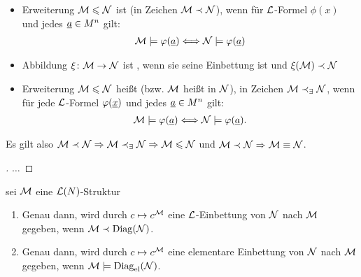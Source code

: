 \begin{definition}
	\begin{itemize}
		\item Erweiterung $\mathcal M \leqslant \mathcal N$ ist  (in Zeichen $\mathcal M \prec \mathcal N$), wenn für  $\mathcal L$-Formel $\phi(x)$ und jedes $\underline{a} \in M^n$ gilt:
		\begin{align*}
		\mathcal M \models \varphi(\underline{a}) \Longleftrightarrow \mathcal N \models \varphi(\underline{a})
		\end{align*}
		\item Abbildung $\xi \colon \mathcal M \to \mathcal N$ ist , wenn sie seine Einbettung ist und $\xi(\mathcal M) \prec \mathcal N$
		\item Erweiterung $\mathcal M \leqslant \mathcal N$ heißt  (bzw. $\mathcal M$ heißt  in $\mathcal N$), in Zeichen $\mathcal M \prec_{\exists} \mathcal N$, wenn für jede  $\mathcal L$-Formel $\varphi(\underline{x})$ und jedes $\underline{a} \in M^n$ gilt:
		\begin{align*}
			\mathcal M \models \varphi(\underline{a}) \Longleftrightarrow \mathcal N \models \varphi(\underline{a}).
		\end{align*}
	\end{itemize}
\end{definition}
\begin{remark}
	Es gilt also $\mathcal M\prec \mathcal N \Rightarrow \mathcal M \prec_{\exists} \mathcal N \Rightarrow \mathcal M \leqslant \mathcal N$ und $\mathcal M \prec \mathcal N \Rightarrow \mathcal M \equiv \mathcal N$.
\end{remark}
\begin{proof}[]
	$\dots$
\end{proof}
\begin{remark}
	 sei $\mathcal M$ eine $\mathcal L(N)$-Struktur
	\begin{enumerate}
		\item Genau dann, wird durch $c \mapsto c^{\mathcal M}$ eine $\mathcal L$-Einbettung von $\mathcal N$ nach $\mathcal M$ gegeben, wenn $\mathcal M \prec \operatorname{Diag}(\mathcal N)$.
		\item Genau dann, wird durch $c \mapsto c^{\mathcal M}$ eine elementare Einbettung von $\mathcal N$ nach $\mathcal M$ gegeben, wenn $\mathcal M \models \operatorname{Diag}_{\operatorname{el}}(\mathcal N)$.
	\end{enumerate}
\end{remark}
